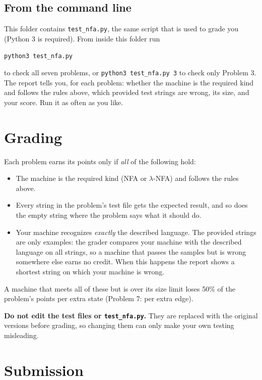\documentclass[11pt]{article}
\begin{document}
\subsection*{From the command line}
This folder contains \texttt{test\_nfa.py}, the same script that is used to grade you (Python 3
is required). From inside this folder run
\begin{center}
\texttt{python3 test\_nfa.py}
\end{center}
to check all seven problems, or \texttt{python3 test\_nfa.py 3} to check only Problem 3. The
report tells you, for each problem: whether the machine is the required kind and follows the rules above, which provided
test strings are wrong, its size, and your score. Run it as often as you like.

\section*{Grading}

Each problem earns its points only if \emph{all} of the following hold:
\begin{itemize}
  \item The machine is the required kind (NFA or $\lambda$-NFA) and follows the rules above.
  \item Every string in the problem's test file gets the expected result, and so does the
        empty string where the problem says what it should do.
  \item Your machine recognizes \emph{exactly} the described language. The provided strings are
        only examples: the grader compares your machine with the described language on all
        strings, so a machine that passes the samples but is wrong somewhere else earns no
        credit. When this happens the report shows a shortest string on which your machine is
        wrong.
\end{itemize}
A machine that meets all of these but is over its size limit loses 50\% of the problem's points
per extra state (Problem 7: per extra edge).

\textbf{Do not edit the test files or \texttt{test\_nfa.py}.} They are replaced with the
original versions before grading, so changing them can only make your own testing misleading.

\section*{Submission}
\end{document}
